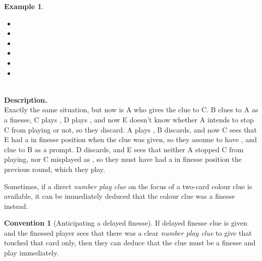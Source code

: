 \documentclass[a4paper]{article}
\theoremstyle{plain}
\theoremstyle{definition}
\newtheorem{example}[theorem]{Example}
\newtheorem{convention}[theorem]{Convention}
\begin{document}
\begin{example}	\hfill \\
	\begin{minipage}{0.45\textwidth}
		\begin{itemize}
			\item[\Large +]      
			\item[\Large A]    
			\item[\Large B]    
			\item[\Large C]    
			\item[\Large D]    
			\item[\Large E]    
		\end{itemize}
	\end{minipage}%
	\begin{minipage}{0.55\textwidth}
		\hfill \\
		
		\textbf{Description.} \\
		
		Exactly the same situation, but now is A who gives the  clue to C. B clues  to A as a finesse, C plays , D plays , and now E doesn't know whether A intends to stop C from playing  or not, so they discard. A plays , B discards, and now C sees that E had a  in finesse position when the  clue was given, so they assume to have , and clue  to B as a prompt. D discards, and E sees that neither A stopped C from playing, nor C misplayed  as , so they must have had a  in finesse position the previous round, which they play.
	\end{minipage}
\end{example} \vspace{0.15 cm}

Sometimes, if a direct \emph{number play clue} on the focus of a two-card colour clue is available, it can be immediately deduced that the colour clue was a finesse instead.

\begin{convention}[Anticipating a delayed finesse]
	\label{anticipated-delayed-finesse}
	If delayed finesse clue is given and the finessed player sees that there was a clear \emph{number play clue} to give that touched that card only, then they can deduce that the clue must be a finesse and play immediately.
\end{convention}
\end{document}
